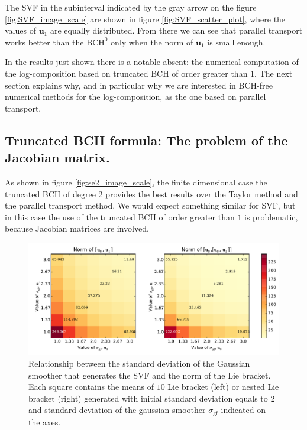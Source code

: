 The SVF in the subinterval indicated by the gray arrow on the figure \ref{fig:SVF_image_scale} are shown in figure \ref{fig:SVF_scatter_plot}, where the values of $\mathbf{u}_1$ are equally distributed. From there we can see that parallel transport works better than the $\text{BCH}^0$ only when the norm of $\mathbf{u}_1$ is small enough.

In the results just shown there is a notable absent: the numerical computation of the log-composition based on truncated BCH of order greater than $1$. The next section explains why, and in particular why we are interested in BCH-free numerical methods for the log-composition, as the one based on parallel transport.


\subsection{Truncated BCH formula: The problem of the Jacobian matrix.}\label{se:jacobian_problem}

As shown in figure \ref{fig:se2_image_scale}, the finite dimensional case the truncated BCH of degree $2$ provides the best results over the Taylor method and the parallel transport method.
We would expect something similar for SVF, but in this case the use of the truncated BCH of order greater than $1$ is problematic, because Jacobian matrices are involved.

\begin{figure}[!ht]
	\hspace{0cm}
	\includegraphics[scale=0.5]{figures/SVF_image_scale_bracket_versus_gaussian.pdf}
	\caption{Relationship between the standard deviation of the Gaussian smoother that generates the SVF and the norm of the Lie bracket. Each square contains the means of $10$ Lie bracket (left) or nested Lie bracket (right) generated with initial standard deviation equals to $2$ and standard deviation of the gaussian smoother $\sigma_{\text{gf}}$ indicated on the axes.}
	\label{fig:SVF_image_scale_bracket_versus_gaussian}
\end{figure}

